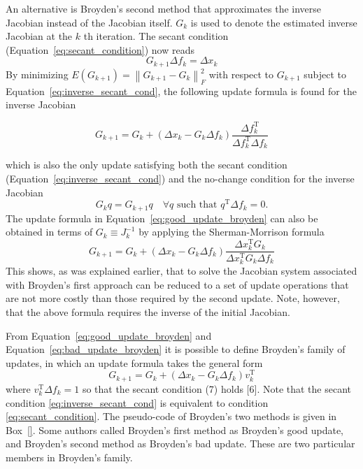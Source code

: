 An alternative is Broyden's second method that approximates the inverse Jacobian instead of the Jacobian itself. 
\(G_{k}\) is used to denote the estimated inverse Jacobian at the \(k\) th iteration. 
The secant condition (Equation~\eqref{eq:secant_condition}) now reads
\begin{equation} \label{eq:inverse_secant_cond}
G_{k+1} \Delta f_{k}=\Delta x_{k}
\end{equation}
By minimizing \(E\left(G_{k+1}\right)=\left\|G_{k+1}-G_{k}\right\|_{F}^{2}\) with respect to \(G_{k+1}\) subject to Equation~\eqref{eq:inverse_secant_cond}, the following update formula is found for the inverse Jacobian
\begin{highlight}
  \begin{equation} \label{eq:bad_update_broyden}
  G_{k+1}=G_{k}+\left(\Delta x_{k}-G_{k} \Delta f_{k}\right) \frac{\Delta f_{k}^{\mathrm{T}}}{\Delta f_{k}^{\mathrm{T}} \Delta f_{k}}
  \end{equation}
\end{highlight}
which is also the only update satisfying both the secant condition (Equation~\eqref{eq:inverse_secant_cond}) and the no-change condition for the inverse Jacobian
\begin{equation}
  G_{k} q=G_{k+1} q \quad \forall q \text { such that } q^{\mathrm{T}} \Delta f_{k}=0.
\end{equation}
The update formula in Equation~\eqref{eq:good_update_broyden} can also be obtained in terms of \(G_{k} \equiv J_{k}^{-1}\) by applying the Sherman-Morrison formula
\begin{equation}
G_{k+1}=G_{k}+\left(\Delta x_{k}-G_{k} \Delta f_{k}\right) \frac{\Delta x_{k}^{\mathrm{T}} G_{k}}{\Delta x_{k}^{\mathrm{T}} G_{k} \Delta f_{k}}
\end{equation}
This shows, as was explained earlier, that to solve the Jacobian system associated with Broyden's first approach can be reduced to a set of update operations that are not more costly than those required by the second update. 
Note, however, that the above formula requires the inverse of the initial Jacobian.

From Equation~\eqref{eq:good_update_broyden} and Equation~\eqref{eq:bad_update_broyden} it is possible to define Broyden's family of updates, in which an update formula takes the general form
\begin{equation}
G_{k+1}=G_{k}+\left(\Delta x_{k}-G_{k} \Delta f_{k}\right) v_{k}^{\mathrm{T}}
\end{equation}
where \(v_{k}^{\mathrm{T}} \Delta f_{k}=1\) so that the secant condition (7) holds [6]. Note that the secant condition \eqref{eq:inverse_secant_cond} is equivalent to condition \eqref{eq:secant_condition}. 
The pseudo-code of Broyden's two methods is given in Box~\ref{}.
Some authors called Broyden's first method as Broyden's good update, and Broyden's second method as Broyden's bad update. 
These are two particular members in Broyden's family.

